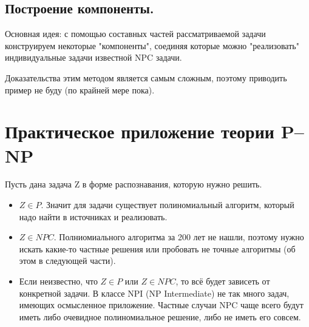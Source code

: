 \subsection*{Построение компоненты.}

Основная идея: с помощью составных частей рассматриваемой задачи конструируем некоторые "компоненты"{}, соединяя которые можно "реализовать"{} индивидуальные задачи известной NPC задачи. 

Доказательства этим методом является самым сложным, поэтому приводить пример не буду (по крайней мере пока).

\section{Практическое приложение теории P--NP}

Пусть дана задача Z в форме распознавания, которую нужно решить. 
\begin{itemize}
	\item $Z\in P$. Значит для задачи существует полиномиальный алгоритм,
		который надо найти в источниках и реализовать.
	\item  $Z \in NPC$. Полниомиального алгоритма за 200 лет не нашли,
		поэтому нужно искать какие-то частные решения или пробовать не
		точные алгоритмы (об этом в следующей части).
	\item Если неизвестно, что  $Z\in P$ или  $Z \in NPC$, то всё будет
		зависеть от конкретной задачи. В классе NPI (NP Intermediate) не
		так много задач, имеющих осмысленное приложение. Частные случаи
		NPC чаще всего будут иметь либо очевидное полиномиальное
		решение, либо не иметь его совсем.
\end{itemize}











